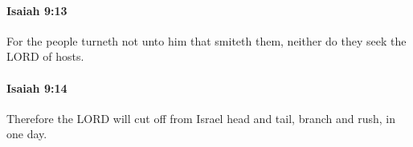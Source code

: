 		\paragraph{Isaiah 9:13} %
			\label{ISAIAH-9-13}

			For the people turneth not unto him that smiteth them, neither do they seek the LORD of hosts.


		\paragraph{Isaiah 9:14} %
			\label{ISAIAH-9-14}

			Therefore the LORD will cut off from Israel head and tail, branch and rush, in one day.


